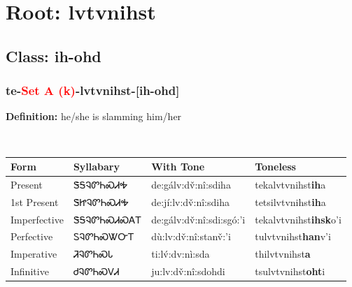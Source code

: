 \needspace{4in}
\section*{Root: lvtvnihst}
\nopagebreak
{}
\needspace{3in}
\subsection*{Class: ih-ohd}
\nopagebreak
\needspace{2in}
\subsubsection*{te{-}\textcolor{Red}{Set A (k)}{-}\textbf{lvtvnihst}{-}[ih-ohd]}
\nopagebreak
\textbf{Definition: } he/she is slamming him/her
\\[0.5em]
\begin{tabularx}{\textwidth}{l X X X}%
\toprule%
\textbf{Form}&\textbf{Syllabary}&\textbf{With Tone}&\textbf{Toneless}\\%
\midrule%
Present&ᏕᎦᎸᏛᏂᏍᏗᎭ&de:gálv:dv̌:nî:sdiha&tekalvtvnihst\textbf{ih}a\\%
1st Present&ᏕᏥᎸᏛᏂᏍᏗᎭ&de:jí:lv:dv̌:nî:sdiha&tetsilvtvnihst\textbf{ih}a\\%
Imperfective&ᏕᎦᎸᏛᏂᏍᏗᏍᎪᎢ&de:gálv:dv̌:nî:sdi:sgó:’i&tekalvtvnihst\textbf{ihsk}o'i\\%
Perfective&ᏚᎸᏛᏂᏍᏔᏅᎢ&dù:lv:dv̌:nî:stanv̌:’i&tulvtvnihst\textbf{han}v'i\\%
Imperative&ᏘᎸᏛᏂᏍᏓ&ti:lv́:dv:nì:sda&thilvtvnihst\textbf{a}\\%
Infinitive&ᏧᎸᏛᏂᏍᏙᏗ&ju:lv:dv̌:nî:sdohdi&tsulvtvnihst\textbf{oht}i\\%
\bottomrule%
\end{tabularx}
\\[1em]
